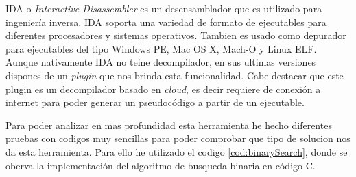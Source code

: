 IDA o \textit{Interactive Disassembler} es un desensamblador que es utilizado para ingeniería inversa. IDA soporta una variedad de formato de ejecutables para diferentes procesadores y
sistemas operativos. Tambien es usado como depurador para ejecutables del tipo Windows PE, Mac OS X, Mach-O y Linux ELF\cite{IDAPro_Wikipedia}. Aunque nativamente IDA no teine decompilador, 
en sus ultimas versiones dispones de un \textit{plugin} que nos brinda esta funcionalidad. Cabe destacar que este plugin es un decompilador basado en \textit{cloud}, es decir requiere
de conexión a internet para poder generar un pseudocódigo a partir de un ejecutable.

Para poder analizar en mas profundidad esta herramienta he hecho diferentes pruebas con codigos muy sencillas para poder comprobar que tipo de solucion nos da esta herramienta. Para ello
he utilizado el codigo \ref{cod:binarySearch}, donde se oberva la implementación del algoritmo de busqueda binaria en código C.

